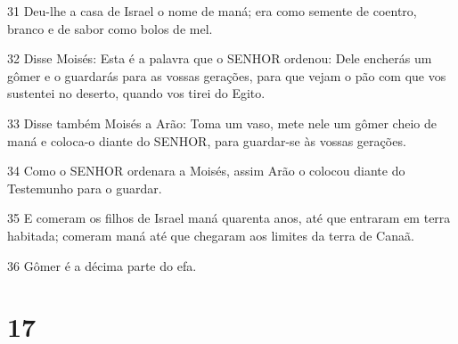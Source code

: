 \par 31 Deu-lhe a casa de Israel o nome de maná; era como semente de coentro, branco e de sabor como bolos de mel.
\par 32 Disse Moisés: Esta é a palavra que o SENHOR ordenou: Dele encherás um gômer e o guardarás para as vossas gerações, para que vejam o pão com que vos sustentei no deserto, quando vos tirei do Egito.
\par 33 Disse também Moisés a Arão: Toma um vaso, mete nele um gômer cheio de maná e coloca-o diante do SENHOR, para guardar-se às vossas gerações.
\par 34 Como o SENHOR ordenara a Moisés, assim Arão o colocou diante do Testemunho para o guardar.
\par 35 E comeram os filhos de Israel maná quarenta anos, até que entraram em terra habitada; comeram maná até que chegaram aos limites da terra de Canaã.
\par 36 Gômer é a décima parte do efa.

\chapter{17}

